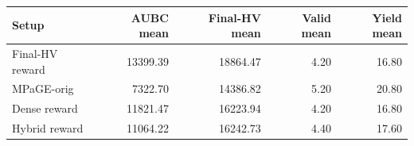 \begin{tabular}{lrrrr}
\toprule
Setup & AUBC mean & Final-HV mean & Valid mean & Yield mean \\
\midrule
Final-HV reward & 13399.39 & 18864.47 & 4.20 & 16.80 \\
MPaGE-orig & 7322.70 & 14386.82 & 5.20 & 20.80 \\
Dense reward & 11821.47 & 16223.94 & 4.20 & 16.80 \\
Hybrid reward & 11064.22 & 16242.73 & 4.40 & 17.60 \\
\bottomrule
\end{tabular}
